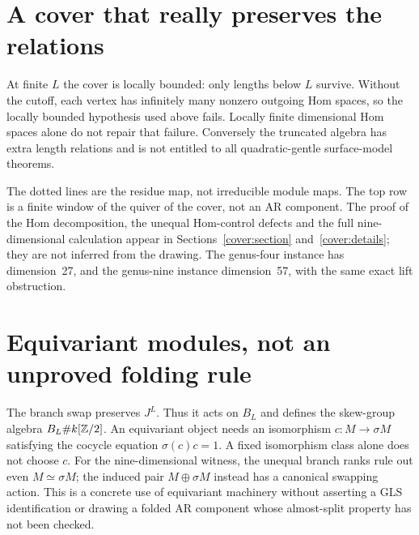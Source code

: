 \section{A cover that really preserves the relations}
At finite $L$ the cover is locally bounded: only lengths below $L$ survive.
Without the cutoff, each vertex has infinitely many nonzero outgoing Hom
spaces, so the locally bounded hypothesis used above fails. Locally finite
dimensional Hom spaces alone do not repair that failure. Conversely the
truncated algebra has extra length relations and is not entitled to all
quadratic-gentle surface-model theorems.

\begin{center}
\par{}
\end{center}
The dotted lines are the residue map, not irreducible module maps. The top
row is a finite window of the quiver of the cover, not an AR component.
The proof of the Hom decomposition, the unequal Hom-control defects and the
full nine-dimensional calculation appear in
Sections~\ref{cover:section} and~\ref{cover:details}; they are not inferred
from the drawing. The genus-four instance has dimension~27, and the
genus-nine instance dimension~57, with the same exact lift obstruction.

\section{Equivariant modules, not an unproved folding rule}
The branch swap preserves $J^L$. Thus it acts on $B_L$ and defines the
skew-group algebra $B_L\# k[\mathbb Z/2]$. An equivariant object needs an
isomorphism $c:M\to\sigma M$ satisfying the cocycle equation
$\sigma(c)c=1$. A fixed isomorphism class alone does not choose $c$.
For the nine-dimensional witness, the unequal branch ranks rule out even
$M\simeq\sigma M$; the induced pair $M\oplus\sigma M$ instead has a
canonical swapping action. This is a concrete use of equivariant machinery
without asserting a GLS identification or drawing a folded AR component
whose almost-split property has not been checked.

